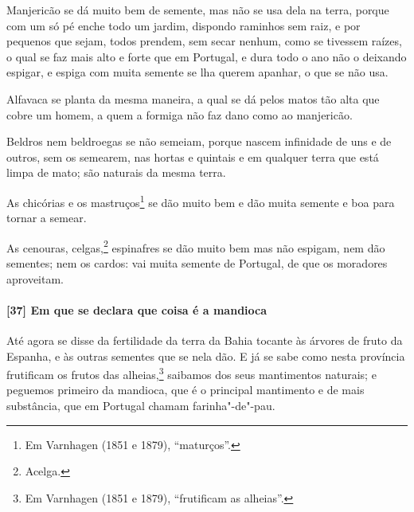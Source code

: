 \begin{linenumbers}
Manjericão se dá muito bem de semente, mas não se usa dela na terra, porque com um só pé
enche todo um jardim, dispondo raminhos sem raiz, e por pequenos que sejam, todos prendem,
sem secar nenhum, como se tivessem raízes, o qual se faz mais alto e forte que em
Portugal, e dura todo o ano não o deixando espigar, e espiga com muita semente se lha
querem apanhar, o que se não usa.

Alfavaca se planta da mesma maneira, a qual se dá pelos matos tão alta que cobre um homem,
a quem a formiga não faz dano como ao manjericão.

Beldros nem beldroegas se não semeiam, porque nascem infinidade de uns e de outros, sem os
semearem, nas hortas e quintais e em qualquer terra que está limpa de mato; são naturais
da mesma terra.

As chicórias e os mastruços\footnote{ Em Varnhagen (1851 e 1879), ``maturços''.} se dão
muito bem e dão muita semente e boa para tornar a semear.

As cenouras, celgas,\footnote{ Acelga.} espinafres se dão muito bem mas não espigam, nem
dão sementes; nem os cardos: vai muita semente de Portugal, de que os moradores
aproveitam.

\paragraph{[37] Em que se declara que coisa é a mandioca}\quad
Até agora se disse da fertilidade da terra da Bahia tocante às árvores de fruto da
Espanha, e às outras sementes que se nela dão. E já se sabe como nesta província
frutificam os frutos das alheias,\footnote{ Em Varnhagen (1851 e 1879), ``frutificam as
alheias''.} saibamos dos seus mantimentos naturais; e peguemos primeiro da mandioca, que é
o principal mantimento e de mais substância, que em Portugal chamam farinha"-de"-pau.


\end{linenumbers}
